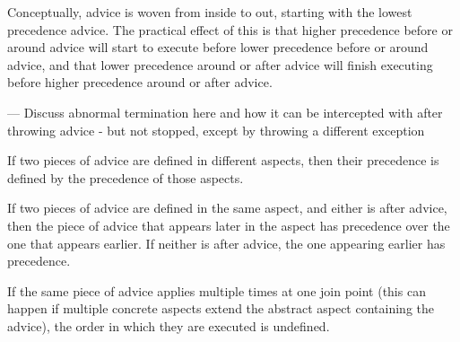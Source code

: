 \documentclass[12pt,a4paper]{report}
\begin{document}
Conceptually, advice is woven from inside to out, starting with the lowest
precedence advice. The practical effect of this is that higher precedence
before or around advice will start to execute before lower precedence before
or around advice, and that lower precedence around or after advice will 
finish executing before higher precedence around or after advice. 

--- Discuss abnormal termination here and how it can be intercepted with
after throwing advice - but not stopped, except by throwing a different
exception

If two pieces of advice are defined 
in different aspects, then their precedence is defined by the precedence
of those aspects.

If two pieces of advice are defined in the same aspect, and either is after
advice, then the piece of advice that appears later in the aspect has 
precedence over the one that appears earlier. If neither is after advice,
the one appearing earlier has precedence.

If the same piece of advice applies multiple times at one join point
(this can happen if multiple concrete aspects extend the abstract aspect
containing the advice), the order in which they are executed is undefined.
\end{document}
